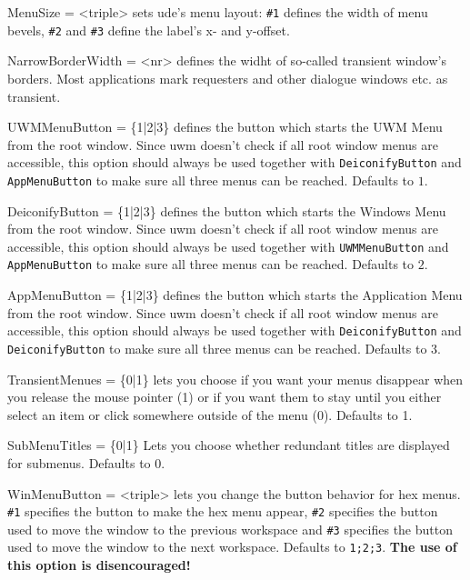 \documentclass[10pt,a4paper]{article}
\newenvironment{ttdesc}[1]{
   \begin{list}{}{
          \renewcommand{\makelabel}[1]{\texttt{##1\hfill}}}}{\end{list}}
\begin{document}
\begin{ttdesc}{description}
\item[MenuSize = <triple>] sets ude's menu layout: \texttt{\#1} defines the width of menu bevels, \texttt{\#2} and \texttt{\#3} define the label's x- and y-offset.

\item[NarrowBorderWidth = <nr>] defines the widht of so-called transient window's borders. Most applications mark requesters and other dialogue windows etc. as transient.

\item[UWMMenuButton = \{1|2|3\}] defines the button which starts the \textsf{UWM Menu} from the root window. Since uwm doesn't check if all root window menus are accessible, this option should always be used together with \texttt{DeiconifyButton} and \texttt{AppMenuButton} to make sure all three menus can be reached. Defaults to $1$.  

\item[DeiconifyButton = \{1|2|3\}] defines the button which starts the \textsf{Windows Menu} from the root window. Since uwm doesn't check if all root window menus are accessible, this option should always be used together with \texttt{UWMMenuButton} and \texttt{AppMenuButton} to make sure all three menus can be reached. Defaults to $2$.

\item[AppMenuButton = \{1|2|3\}] defines the button which starts the \textsf{Application Menu} from the root window. Since uwm doesn't check if all root window menus are accessible, this option should always be used together with \texttt{DeiconifyButton} and \texttt{DeiconifyButton} to make sure all three menus can be reached. Defaults to $3$.

\item[TransientMenues = \{0|1\}] lets you choose if you want your menus disappear when you release the mouse pointer (1) or if you want them to stay until you either select an item or click somewhere outside of the menu (0). Defaults to 1.

\item[SubMenuTitles = \{0|1\}] Lets you choose whether redundant titles are displayed for submenus. Defaults to 0.

\item[WinMenuButton = <triple>] lets you change the button behavior for hex menus. \texttt{\#1} specifies the button to make the hex menu appear, \texttt{\#2} specifies the button used to move the window to the previous workspace and \texttt{\#3} specifies the button used to move the window to the next workspace. Defaults to \texttt{1;2;3}. \textbf{The use of this option is disencouraged!}


\end{ttdesc}
\end{document}
